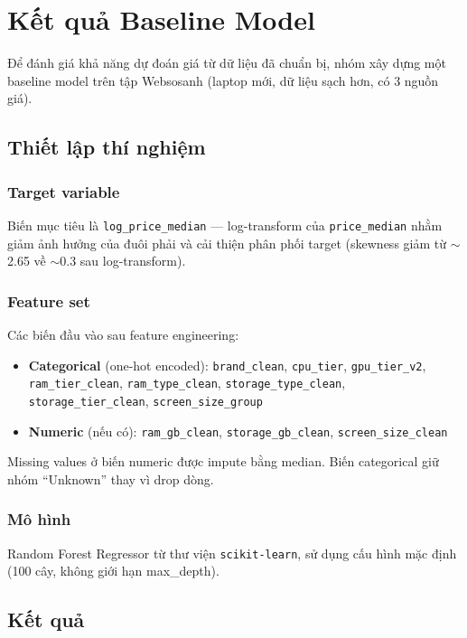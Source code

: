 \section{Kết quả Baseline Model}
\label{sec:results}

Để đánh giá khả năng dự đoán giá từ dữ liệu đã chuẩn bị, nhóm xây dựng một baseline model trên tập Websosanh (laptop mới, dữ liệu sạch hơn, có 3 nguồn giá).

\subsection{Thiết lập thí nghiệm}

\subsubsection{Target variable}
Biến mục tiêu là \texttt{log\_price\_median} --- log-transform của \texttt{price\_median} nhằm giảm ảnh hưởng của đuôi phải và cải thiện phân phối target (skewness giảm từ $\sim$2.65 về $\sim$0.3 sau log-transform).

\subsubsection{Feature set}
Các biến đầu vào sau feature engineering:
\begin{itemize}[noitemsep]
    \item \textbf{Categorical} (one-hot encoded): \texttt{brand\_clean}, \texttt{cpu\_tier}, \texttt{gpu\_tier\_v2}, \texttt{ram\_tier\_clean}, \texttt{ram\_type\_clean}, \texttt{storage\_type\_clean}, \texttt{storage\_tier\_clean}, \texttt{screen\_size\_group}
    \item \textbf{Numeric} (nếu có): \texttt{ram\_gb\_clean}, \texttt{storage\_gb\_clean}, \texttt{screen\_size\_clean}
\end{itemize}

Missing values ở biến numeric được impute bằng median. Biến categorical giữ nhóm ``Unknown'' thay vì drop dòng.

\subsubsection{Mô hình}
Random Forest Regressor\cite{breiman2001random} từ thư viện \texttt{scikit-learn}\cite{pedregosa2011scikit}, sử dụng cấu hình mặc định (100 cây, không giới hạn max\_depth).

\subsection{Kết quả}

